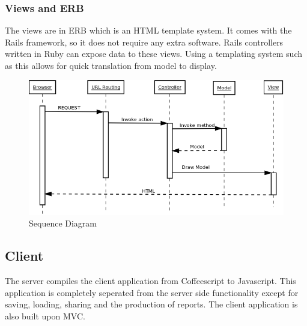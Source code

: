 \documentclass{report}
\begin{document}
				\subsubsection{Views and ERB} 
					The views are in ERB \cite{erb} which is an HTML template system. It comes with the Rails framework, so it does not require any extra software. Rails controllers written in Ruby can expose data to these views. Using a templating system such as this allows for quick translation from model to display. 
			\begin{figure}[htb]
				\begin{center}
				\includegraphics[width=\linewidth]{SequenceDiagramLife.png}
				\caption{Sequence Diagram}
				\label{fig: SequenceDiagram}
				\end{center}
				\end{figure}	
			\clearpage

			\subsection{Client}
				The server compiles the client application from Coffeescript to Javascript. This application is completely seperated from the server side functionality except for saving, loading, sharing and the production of reports. The client application is also built upon MVC.\\	
				
\end{document}
